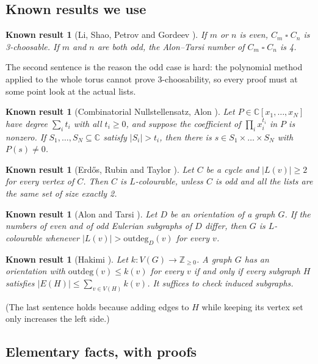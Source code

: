 \documentclass[11pt]{article}
\theoremstyle{plain}
\newtheorem{known}[theorem]{Known result}
\theoremstyle{definition}
\theoremstyle{remark}
\newcommand{\T}{\mathbin{\square}}
\newcommand{\Z}{\mathbb{Z}}
\newcommand{\C}{\mathbb{C}}
\begin{document}
\subsection{Known results we use}

\begin{known}[Li, Shao, Petrov and Gordeev \cite{LSPG}]\label{lspg}
If $m$ or $n$ is even, $C_m \T C_n$ is 3-choosable. If $m$ and $n$ are both odd, the Alon--Tarsi number of
$C_m \T C_n$ is 4.
\end{known}

The second sentence is the reason the odd case is hard: the polynomial method applied to the whole torus
cannot prove 3-choosability, so every proof must at some point look at the actual lists.

\begin{known}[Combinatorial Nullstellensatz, Alon \cite{Alon}]\label{cn}
Let $P \in \C[x_1, \dots, x_N]$ have degree $\sum_i t_i$ with all $t_i \ge 0$, and suppose the coefficient of
$\prod_i x_i^{t_i}$ in $P$ is nonzero. If $S_1, \dots, S_N \subseteq \C$ satisfy $|S_i| > t_i$, then there is
$s \in S_1 \times \dots \times S_N$ with $P(s) \ne 0$.
\end{known}

\begin{known}[Erd\H{o}s, Rubin and Taylor \cite{ERT}]\label{cycle}
Let $C$ be a cycle and $|L(v)| \ge 2$ for every vertex of $C$. Then $C$ is $L$-colourable, unless $C$ is odd and all
the lists are the same set of size exactly 2.
\end{known}

\begin{known}[Alon and Tarsi \cite{AT}]\label{at}
Let $D$ be an orientation of a graph $G$. If the numbers of even and of odd Eulerian subgraphs of $D$ differ,
then $G$ is $L$-colourable whenever $|L(v)| > \mathrm{outdeg}_D(v)$ for every $v$.
\end{known}

\begin{known}[Hakimi \cite{Hak}]\label{hakimi}
Let $k : V(G) \to \Z_{\ge 0}$. A graph $G$ has an orientation with $\mathrm{outdeg}(v) \le k(v)$ for every $v$ if and
only if every subgraph $H$ satisfies $|E(H)| \le \sum_{v \in V(H)} k(v)$. It suffices to check induced subgraphs.
\end{known}

(The last sentence holds because adding edges to $H$ while keeping its vertex set only increases the left side.)

\subsection{Elementary facts, with proofs}
\end{document}
